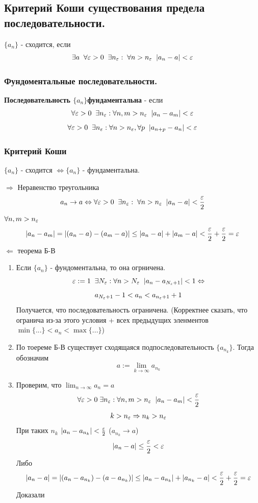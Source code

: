 \subsection{Критерий Коши существования предела последовательности.}

$\{a_n\}$ - сходится, если
\[ \exists a\;\; \forall \varepsilon > 0\;\; \exists n_\varepsilon:\; \forall n > n_\varepsilon\;\; |a_n - a| < \varepsilon \]

\subsubsection*{Фундоментальные последовательности.}
\begin{tcolorbox}
    \textbf{Последовательность $\{a_n\} $фундаментальна} - если
    \[\forall \varepsilon>0 \;\; \exists n_\varepsilon : \forall n, m > n_\varepsilon \;\; |a_n-a_m| < \varepsilon\]
    \[ \forall \varepsilon>0 \;\; \exists n_\varepsilon : \forall n > n_\varepsilon,\forall  p \;\; |a_{n+p}-a_n| < \varepsilon \]
\end{tcolorbox}

\subsubsection*{Критерий Коши}
\begin{tcolorbox}
    $\{a_n\}$ - сходится $\Leftrightarrow \{a_n\}$ - фундаментальна.
\end{tcolorbox}

\begin{tcolorbox}[title=Доказательство]
    $\Rightarrow$ Неравенство треугольника 
    \[ a_n \to a \Leftrightarrow \forall \varepsilon > 0\;\; \exists n_\varepsilon:\; \forall n > n_\varepsilon\;\; |a_n - a| < \frac{\varepsilon}{2} \]
    $\forall n, m > n_\varepsilon$
\[ |a_n - a_m| = |(a_n - a) - (a_m - a)| \leq |a_n - a| + |a_m - a| < \frac{\varepsilon}{2} + \frac{\varepsilon}{2} = \varepsilon \]
    $\Leftarrow$ теорема Б-В 
    \begin{enumerate}
	    \item Если $\{a_n\}$ - фундоментальна, то она огрничена. 
		    \[ \varepsilon := 1\;\; \exists N_\varepsilon: \forall n > N_\varepsilon\;\; |a_n - a_{N_\varepsilon + 1}| < 1 \Leftrightarrow \]
		    \[ a_{N_\varepsilon + 1} - 1 < a_n < a_{n_\varepsilon + 1} + 1  \]
		    Получается, что последовательность ограничена. (Корректнее сказать, что огранича из-за этого условия + всех предыдущих эленментов $\min\{...\}<a_n<\max\{...\}$)
	    \item По тоереме Б-В существует сходящаяся подпоследовательность $\{a_{n_k}\}$. Тогда обозначим
		    \[ a:= \lim_{k\to \infty} a_{n_k} \]
	    \item Проверим, что $\lim_{n\to \infty} a_{n} = a$\\
		    \[ \forall \varepsilon > 0\; \exists n_\varepsilon: \forall n,m > n_\varepsilon \;\; |a_n - a_m| < \frac{\varepsilon}{2}  \]
		    \[ k > n_\varepsilon \Rightarrow n_k > n_\varepsilon \]
		    При таких $n_k$ $|a_n - a_{n_k}| < \frac{\varepsilon}{2}$  ($a_{n_k} \to a$)
		    \[ |a_n - a| \leq \frac{\varepsilon}{2} < \varepsilon \]
		    Либо 
		    \[ |a_n - a|= |(a_n - a_{n_k}) - (a - a_{n_k})| \leq |a_n - a_{n_k}| + |a_{n_k} - a| < \frac{\varepsilon}{2} + \frac{\varepsilon}{2} = \varepsilon\]
		    Доказали
    \end{enumerate}
\end{tcolorbox}


